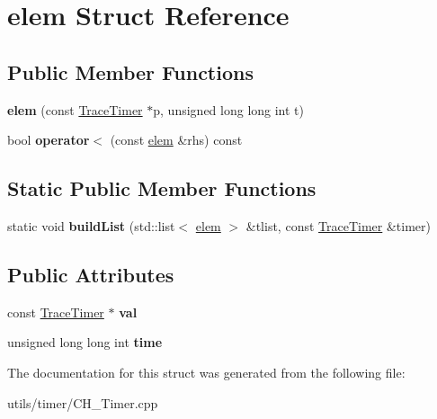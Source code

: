 \hypertarget{structelem}{}\section{elem Struct Reference}
\label{structelem}
\subsection*{Public Member Functions}
\begin{DoxyCompactItemize}
\item 
\mbox{\label{structelem_a1b3c3f35e36509cd5c5d4b58d2cd2c4b}} 
{\bfseries elem} (const \hyperlink{class_trace_timer}{Trace\+Timer} $\ast$p, unsigned long long int t)
\item 
\mbox{\label{structelem_afc90c9ef3883f277244a1dc7fadecf0b}} 
bool {\bfseries operator$<$} (const \hyperlink{structelem}{elem} \&rhs) const
\end{DoxyCompactItemize}
\subsection*{Static Public Member Functions}
\begin{DoxyCompactItemize}
\item 
\mbox{\label{structelem_a89030e25e760d130062432961126f9c9}} 
static void {\bfseries build\+List} (std\+::list$<$ \hyperlink{structelem}{elem} $>$ \&tlist, const \hyperlink{class_trace_timer}{Trace\+Timer} \&timer)
\end{DoxyCompactItemize}
\subsection*{Public Attributes}
\begin{DoxyCompactItemize}
\item 
\mbox{\label{structelem_a70c81057f0b23f069da106d48887d445}} 
const \hyperlink{class_trace_timer}{Trace\+Timer} $\ast$ {\bfseries val}
\item 
\mbox{\label{structelem_abcb627f67401148616c650951b93b50e}} 
unsigned long long int {\bfseries time}
\end{DoxyCompactItemize}


The documentation for this struct was generated from the following file\+:\begin{DoxyCompactItemize}
\item 
utils/timer/C\+H\+\_\+\+Timer.\+cpp\end{DoxyCompactItemize}
